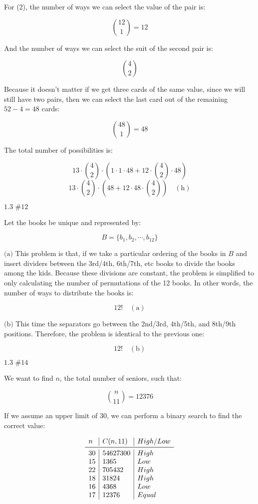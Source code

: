\documentclass{article}
\newcommand{\problem}[2]{$\boxed{\text{#1 \##2}}$}
\newcommand{\subproblem}[1]{$\boxed{\text{(#1)}}$}
\newcommand{\subsolution}[2]{\boxed{#2\quad(\text{#1})}}
\begin{document}
\begin{multicols*}{2}
For (2), the number of ways we can select the value of the pair is:

\[
\binom{12}{1}=12
\]

And the number of ways we can select the suit of the second pair is:

\[
\binom{4}{2}
\]

Because it doesn't matter if we get three cards of the same value,
since we will still have two pairs, then we can select the last card
out of the remaining $52-4=48$ cards:

\[
\binom{48}{1}=48
\]

The total number of possibilities is:

\[
13\cdot\binom{4}{2}\cdot\left(1\cdot1\cdot48+12\cdot\binom{4}{2}\cdot48\right)
\] \[
\subsolution{h}{13\cdot\binom{4}{2}\cdot\left(48+12\cdot48\cdot\binom{4}{2}\right)}
\]

%
\problem{1.3}{12}

Let the books be unique and represented by:

\[
B=\{b_1,b_2,\cdots,b_{12}\}
\]

%
\subproblem{a} This problem is that, if we take a particular ordering
of the books in $B$ and insert dividers between the 3rd/4th, 6th/7th,
etc books to divide the books among the kids. Because these divisions
are constant, the problem is simplified to only calculating the number
of permutations of the 12 books. In other words, the number of ways to
distribute the books is:

\[
\subsolution{a}{12!}
\]

%
\subproblem{b} This time the separators go between the 2nd/3rd,
4th/5th, and 8th/9th positions. Therefore, the problem is identical to
the previous one:

\[
\subsolution{b}{12!}
\]

%
\problem{1.3}{14}

We want to find $n$, the total number of seniors, such that:

\[
\binom{n}{11}=12376
\]

If we assume an upper limit of $30$, we can perform a binary search to
find the correct value:

\[
\begin{array}{l|l|l}
n & C(n,11) & High/Low \\
\midrule
30 & 54627300 & High \\
15 & 1365 & Low \\
22 & 705432 & High \\
18 & 31824 & High \\
16 & 4368 & Low \\
17 & 12376 & Equal \\
\end{array}
\]


\end{multicols*}
\end{document}
